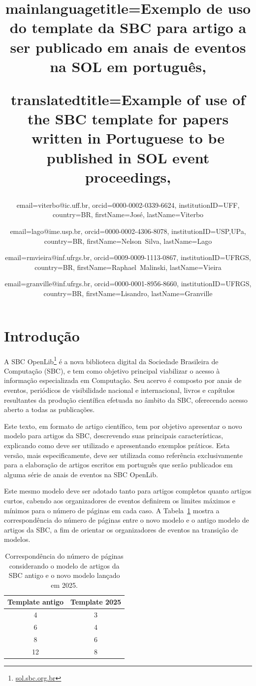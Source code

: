 \documentclass[portuguese,notblind]{sbc20}
\title
  {
    mainlanguagetitle={Exemplo de uso do template da SBC para artigo a ser publicado em anais de eventos na SOL em português},

    translatedtitle={Example of use of the SBC template for papers written in Portuguese to be published in SOL event proceedings},
  }
\author
  {
    email=viterbo@ic.uff.br,
    orcid=0000-0002-0339-6624, 
    institutionID=UFF,
    country=BR,
    firstName=José,
    lastName=Viterbo 
  }
\author
  {
    email=lago@ime.usp.br,
    orcid=0000-0002-4306-8078,
    institutionID={USP,UPa},
    country=BR,
    firstName=Nelson~Silva,
    lastName=Lago
  }
\author
  {
    email=rmvieira@inf.ufrgs.br,
    orcid=0009-0009-1113-0867,
    institutionID={UFRGS},
    country=BR,
    firstName=Raphael~Malinski,
    lastName=Vieira
  }
\author
  {
    email=granville@inf.ufrgs.br,
    orcid=0000-0001-8956-8660,
    institutionID=UFRGS,
    country=BR,
    firstName=Lisandro,
    lastName=Granville
  }
\begin{document}
\maketitle

\section{Introdução}
\label{sec:intro}

A SBC OpenLib\footnote{\url{sol.sbc.org.br}} é a nova biblioteca digital da Sociedade Brasileira de Computação (SBC), e tem como objetivo principal viabilizar o acesso à informação especializada em Computação. Seu acervo é composto por anais de eventos, periódicos de visibilidade nacional e internacional, livros e capítulos resultantes da produção científica efetuada no âmbito da SBC, oferecendo acesso aberto a todas as publicações.

Este texto, em formato de artigo científico, tem por objetivo apresentar o novo modelo para artigos da SBC, descrevendo suas principais características, explicando como deve ser utilizado e apresentando exemplos práticos. Esta versão, mais especificamente, deve ser utilizada como referência exclusivamente para a elaboração de artigos escritos em português que serão publicados em alguma série de anais de eventos na SBC OpenLib.

Este mesmo modelo deve ser adotado tanto para artigos completos quanto artigos curtos, cabendo aos organizadores de eventos definirem os limites máximos e mínimos para o número de páginas em cada caso. A Tabela~\ref{tab:equivalence} mostra a correspondência do número de páginas entre o novo modelo e o antigo modelo de artigos da SBC, a fim de orientar os organizadores de eventos na transição de modelos. 

\begin{table}[!hb]
\centering
\begin{tabular}{@{}cc@{}}
\toprule
Template antigo & Template 2025 \\
\midrule
 4  & 3 \\
 6  & 4 \\
 8  & 6 \\
 12  & 8 \\
\bottomrule
\end{tabular}
\caption{Correspondência do número de páginas considerando o modelo de artigos da SBC antigo e o novo modelo lançado em 2025.\label{tab:equivalence}}
\end{table}
\end{document}

